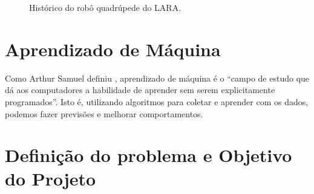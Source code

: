 \documentclass[12pt]{report}
\begin{document}
\begin{figure}[h!]
    \centering
    
    \hfill
    \hfill
    
    \caption{Histórico do robô quadrúpede do LARA. \cite{7}}
    \label{historico}
\end{figure}


\section*{Aprendizado de Máquina}

Como Arthur Samuel definiu \cite{1}, aprendizado de máquina é o ``campo de estudo que dá aos computadores a habilidade de aprender sem serem explicitamente programados''. Isto é, utilizando algoritmos para coletar e aprender com os dados, podemos fazer previsões e melhorar comportamentos.


\section*{Definição do problema e Objetivo do Projeto}
\end{document}
